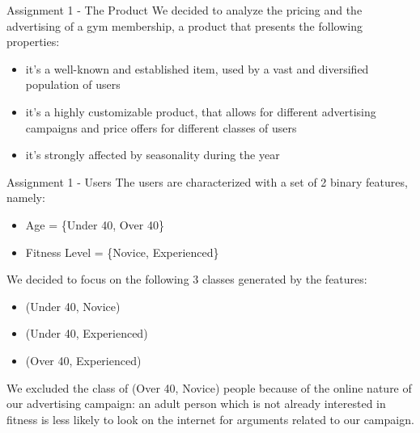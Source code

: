 \documentclass[11pt]{beamer}
\begin{document}

\begin{frame}{Assignment 1 - The Product}
We decided to analyze the pricing and the advertising of a gym membership, a product that presents the following properties:
\begin{itemize}
\item it's a well-known and established item, used by a vast and diversified population of users
\item it's a highly customizable product, that allows for different advertising campaigns and price offers for different classes of users
\item it's strongly affected by seasonality during the year
\end{itemize}
\end{frame}

\begin{frame}{Assignment 1 - Users}
The users are characterized with a set of 2 binary features, namely:
\begin{itemize}
\item Age = \{Under 40, Over 40\}
\item Fitness Level = \{Novice, Experienced\}
\end{itemize}
We decided to focus on the following 3 classes generated by the features:
\begin{itemize}
\item (Under 40, Novice)
\item (Under 40, Experienced)
\item (Over 40, Experienced)
\end{itemize}
We excluded the class of (Over 40, Novice) people because of the online nature of our advertising campaign: an adult person which is not already interested in fitness is less likely to look on the internet for arguments related to our campaign.
\end{frame}
\end{document}

